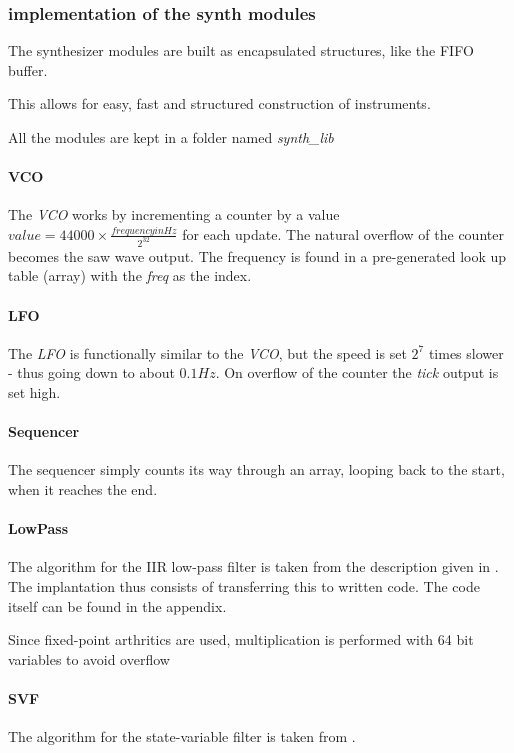 \subsubsection{implementation of the synth modules}
The synthesizer modules are built as encapsulated structures, like the FIFO
buffer.

This allows for easy, fast and structured construction of instruments.

All the modules are kept in a folder named \emph{synth\_lib}

\paragraph{VCO}
The \emph{VCO} works by incrementing a counter by a value $value =
44000 \times \frac{frequency in Hz}{2^{32}}$ for each update. The natural
overflow of the counter becomes the saw wave output. The frequency is found in a
pre-generated look up table (array) with the \emph{freq} as the index. 

\paragraph{LFO}
The \emph{LFO} is functionally similar to the \emph{VCO}, but the speed is set
$2^7$ times slower - thus going down to about $0.1Hz$. On overflow of the
counter the \emph{tick} output is set high.

\paragraph{Sequencer}
The sequencer simply counts its way through an array, looping back to the start,
when it reaches the end.

\paragraph{LowPass}
The algorithm for the IIR low-pass filter is taken from the description given
in \cite{Lowpass}. The implantation thus consists of transferring this to
written code. The code itself can be found in the appendix.

Since fixed-point arthritics are used, multiplication is performed with 64 bit
variables to avoid overflow

\paragraph{SVF}
The algorithm for the state-variable filter is taken from \cite{SVF}.

